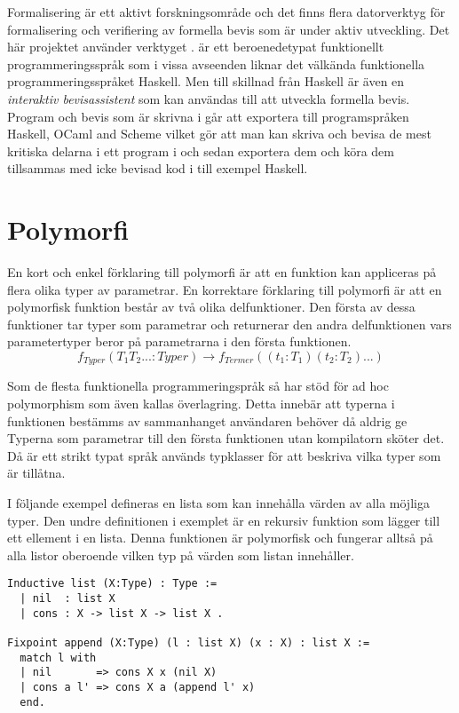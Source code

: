 Formalisering är ett aktivt forskningsområde och det finns flera datorverktyg
för formalisering och verifiering av formella bevis som är under aktiv
utveckling. Det här projektet använder verktyget \coq. \coq är ett
beroenedetypat funktionellt programmeringsspråk som i vissa avseenden liknar
det välkända funktionella programmeringsspråket Haskell. Men till skillnad från
Haskell är \coq även en \emph{interaktiv bevisassistent} som kan användas till
att utveckla formella bevis. Program och bevis som är skrivna i \coq går att
exportera till programspråken Haskell, OCaml and Scheme vilket gör att man kan
skriva och bevisa de mest kritiska delarna i ett program i \coq och sedan
exportera dem och köra dem tillsammas med icke bevisad kod i till exempel
Haskell.

\section{Polymorfi}
En kort och enkel förklaring till polymorfi är att en funktion kan appliceras
på flera olika typer av parametrar. En korrektare förklaring till polymorfi är
att en polymorfisk funktion består av två olika delfunktioner. Den första av
dessa funktioner tar typer som parametrar och returnerar den andra
delfunktionen vars parametertyper beror på parametrarna i den första
funktionen.
\begin{equation}
  f_{Typer}(T_1 T_2 ... : Typer) \rightarrow f_{Termer}((t_1 : T_1) (t_2 : T_2) ...)
\end{equation}

Som de flesta funktionella programmeringspråk så har \coq stöd för ad hoc
polymorphism som även kallas överlagring. Detta innebär att typerna i
funktionen bestämms av sammanhanget användaren behöver då aldrig ge Typerna som
parametrar till den första funktionen utan kompilatorn sköter det. Då \coq är
ett strikt typat språk används typklasser för att beskriva vilka typer som är
tillåtna.

I följande exempel defineras en lista som kan innehålla värden av alla möjliga
typer. Den undre definitionen i exemplet är en rekursiv funktion som lägger
till ett ellement i en lista. Denna funktionen är polymorfisk och fungerar
alltså på alla listor oberoende vilken typ på värden som listan innehåller.
\begin{lstlisting}
Inductive list (X:Type) : Type :=
  | nil  : list X
  | cons : X -> list X -> list X .

Fixpoint append (X:Type) (l : list X) (x : X) : list X :=
  match l with
  | nil       => cons X x (nil X)
  | cons a l' => cons X a (append l' x)
  end.
\end{lstlisting}

